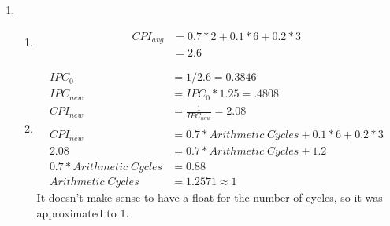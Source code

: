 \documentclass[11pt,letterpaper]{article}
\newcommand\setProbNum[1]{\setcounter{enumi}{\numexpr#1-1\relax}}
\begin{document}
\begin{enumerate}
	\setProbNum{42}
	\item
		\begin{enumerate}[label=(\arabic*)]
			\setProbNum{1}
			\item
				\begin{align*}
					CPI_{avg} &= 0.7 * 2 + 0.1 * 6 + 0.2 * 3\\
					&= 2.6
				\end{align*}
				
			\setProbNum{2}
			\item
				\begin{align*}
					IPC_{0} &= 1/2.6 = 0.3846\\
					IPC_{new} &= IPC_{0} * 1.25 = .4808\\
					CPI_{new} &= \frac{1}{IPC_{new}} = 2.08\\\\
					CPI_{new} &= 0.7 * Arithmetic\; Cycles + 0.1 * 6 + 0.2 * 3\\
					2.08 &= 0.7*Arithmetic\; Cycles + 1.2\\
					0.7 * Arithmetic\; Cycles &= 0.88\\
					Arithmetic\; Cycles &= 1.2571 \approx 1
				\end{align*}
				It doesn't make sense to have a float for the number of cycles, so it was approximated to 1.
		\end{enumerate}


\end{enumerate}
\end{document}
